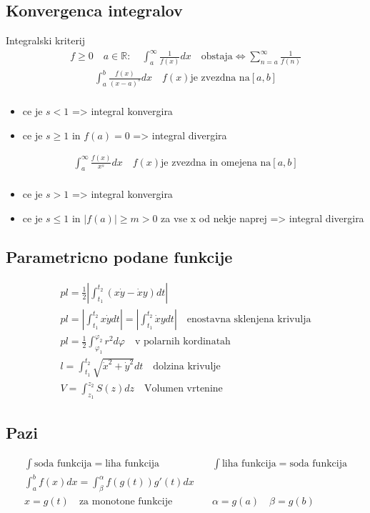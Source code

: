 \documentclass[a4paper,oneside,8pt]{extarticle}
\theoremstyle{definition}
\newcommand{\R}{\ensuremath{\mathbb{R}}}
\renewcommand{\phi}{\varphi}
\newcommand\abs[1]{\left|#1\right|}
\begin{document}
\begin{multicols}{2}
	\subsection*{Konvergenca integralov}
		Integralski kriterij\\
		\begin{align*}
			f \ge 0 \quad a \in \R: \quad \int_{a}^{\infty} \frac{1}{f(x)}dx \quad \text{obstaja} \Longleftrightarrow \sum_{n = a}^{\infty} \frac{1}{f(n)}
		\end{align*}		
		\begin{align*}
			\int_{a}^{b} \frac{f(x)}{(x-a)^s}dx \quad f(x) \text{je zvezdna na} [a,b]\\
		\end{align*}
		\begin{itemize}
			\item ce je $s < 1$ => integral konvergira
			\item ce je $s \geq 1$ in $f(a) = 0$ => integral divergira
		\end{itemize}
		\begin{align*}
			\int_{a}^{\infty} \frac{f(x)}{x^s}dx \quad f(x) \text{je zvezdna in omejena na} [a,b]\\
		\end{align*}
		\begin{itemize}
			\item ce je $s > 1$ => integral konvergira
			\item ce je $s \leq 1$ in $\abs{f(a)} \geq m > 0$ za vse x od nekje naprej => integral divergira
		\end{itemize}
%
	\subsection*{Parametricno podane funkcije}
		\begin{align*}
			pl = \frac{1}{2} \abs{\int_{t_1}^{t_2}(x\dot{y} - \dot{x}y)dt}\\
			pl = \abs{\int_{t_1}^{t_2}x\dot{y}dt} = \abs{\int_{t_1}^{t_2}\dot{x}ydt} \quad \text{enostavna sklenjena krivulja}\\
			pl = \frac{1}{2} \int_{\phi_1}^{\phi_2} r^2 d\phi \quad \text{v polarnih kordinatah}\\
			l = \int_{t_1}^{t_2} \sqrt{\dot{x}^2 + \dot{y}^2}dt \quad \text{dolzina krivulje}\\
			V = \int_{z_1}^{z_2} S(z)dz \quad \text{Volumen vrtenine}
		\end{align*}
%
	\subsection*{Pazi}
	\begin{align*}
		\int \text{soda funkcija} = \text{liha funkcija} &\quad \int \text{liha funkcija} = \text{soda funkcija}\\
		\int_{a}^{b} f(x)dx = \int_{\beta}^{\alpha} f(g(t))g'(t)dx\\
		x = g(t) \quad \text{za monotone funkcije} &\quad \alpha = g(a) \quad \beta = g(b)
	\end{align*}
%

\end{multicols}
\end{document}
